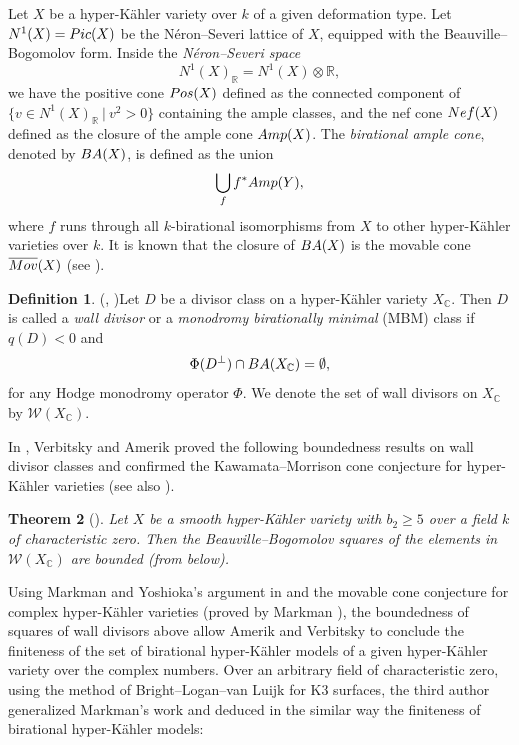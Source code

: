 \documentclass[11pt,reqno,oneside]{amsart}
\numberwithin{equation}{section}
\newtheorem{theorem}{Theorem}[section]
\theoremstyle{definition}
\newtheorem{definition}[theorem]{Definition}
\newcommand{\Pic}{{\rm Pic}}
\newcommand{\Nef}{{\rm Nef}}
\newcommand{\Amp}{{\rm Amp}}
\newcommand{\BA}{{\rm BA}}
\newcommand{\Mov}{{\rm Mov}}
\newcommand{\Pos}{{\rm Pos}}
\newcommand{\CC}{\mathbb{C}}
\newcommand{\RR}{\mathbb{R}}
\begin{document}
Let $X$ be a hyper-Kähler variety over $k$ of a given deformation type. 
Let $N^1(X)=\Pic(X)$ be the  N\'eron--Severi lattice of $X$, equipped with the Beauville--Bogomolov form. Inside the \textit{N\'eron--Severi space} $$N^1(X)_\RR=N^1(X)\otimes \RR,$$ we have the positive cone $\Pos(X)$ defined as the connected component of $\{v\in N^1(X)_\RR~|~ v^2>0\}$ containing the ample classes,  and the nef cone $\Nef(X)$ defined as the closure of the ample cone $\Amp(X)$.  
The \textit{birational ample cone}, denoted by $\BA(X)$, is defined as the union $$\bigcup\limits_f f^\ast \Amp(Y),$$ where $f$ runs through all $k$-birational isomorphisms from $X$ to other hyper-Kähler varieties over $k$.  It is known that the closure of $\BA(X)$ is the movable cone $\overline{\Mov}(X)$ (see \cite{HT13, takamatsu21}).  


 
\begin{definition}(\cite{AV15}, \cite{Mongardi-WallDiv})\label{def:WallDiv}
Let $D$ be a divisor class on a hyper-Kähler variety $X_\CC$. Then $D$ is called a \textit{wall divisor} or a \textit{monodromy birationally minimal} (MBM) class if $q(D) <0$ and $$\Phi(D^\perp) \cap  \BA(X_\CC) =\emptyset, $$ for any
 Hodge monodromy operator $\Phi$. We denote the set of wall divisors on $X_\CC$ by $\mathcal{W}(X_\CC)$.
\end{definition}

    





In \cite{AV17}, Verbitsky and Amerik proved the following boundedness results on wall divisor classes and confirmed the Kawamata--Morrison cone conjecture for hyper-Kähler varieties (see also \cite{AV-IMRN}). 


\begin{theorem}[{\cite[Theorem 1.5, Theorem 1.7]{AV17}}]
\label{con-conj}
Let $X$ be a smooth hyper-Kähler variety with $b_2\geq 5$ over a field $k$ of characteristic zero. Then the Beauville--Bogomolov squares of the elements in $\mathcal{W}(X_\CC)$ are bounded (from below).   
\end{theorem}



Using  Markman and Yoshioka's argument in \cite[Corollary 2.5]{MY15} and the movable cone conjecture for complex hyper-Kähler varieties (proved by Markman \cite{Mar11}), the boundedness of squares of wall divisors above allow Amerik and Verbitsky to conclude the finiteness of the set of birational hyper-Kähler models of a given hyper-Kähler variety over the complex numbers. Over an arbitrary field of characteristic zero, using the method of Bright--Logan--van Luijk \cite{BLvL} for K3 surfaces, the third author \cite[Theorem 4.2.7]{takamatsu21} generalized Markman's work \cite{Mar11} and deduced in the similar way the finiteness of birational hyper-Kähler models:
\end{document}
